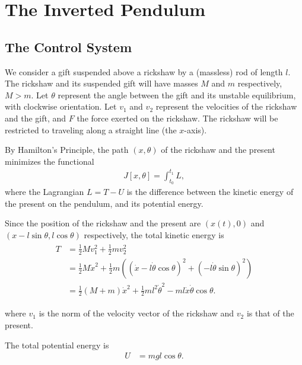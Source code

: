 \section*{The Inverted Pendulum}
\subsection*{The Control System}
We consider a gift suspended above a rickshaw by a (massless) rod of length $l$. 
The rickshaw and its suspended gift will have masses $M$ and $m$ respectively, $M > m$.  
Let $\theta $ represent the angle between the gift and its unstable equilibrium, with clockwise orientation. 
Let $v_1$ and $v_2$ represent the velocities of the rickshaw and the gift, and $F$ the force exerted on the rickshaw. 
The rickshaw will be restricted to traveling along a straight line (the $x$-axis). 

By Hamilton's Principle, the path $(x,\theta)$ of the rickshaw and the present minimizes the functional 
\begin{align}
J[x,\theta] = \int_{t_0}^{t_1}	L,
\end{align}
where the Lagrangian $L = T - U$ is the difference between the kinetic energy of the present on the pendulum, and its potential energy.

Since the position of the rickshaw and the present are $(x(t),0)$ and $(x-l\sin \theta, l\cos \theta)$ respectively, the total kinetic energy is 
\begin{align}
	\begin{split}
	T &= \frac{1}{2}Mv_1^2 +  \frac{1}{2}mv_2^2\\
	&= \frac{1}{2}M\dot{x}^2 +  \frac{1}{2}m\left((\dot{x} - l\dot{\theta}\cos \theta)^2 + (- l\dot{\theta}\sin \theta)^2\right)\\
	&= \frac{1}{2}(M+m)\dot{x}^2 +\frac{1}{2}m l^2\dot{\theta}^2-ml\dot{x}\dot{\theta}\cos \theta.
	\end{split}
\end{align}

\noindent where $v_1$ is the norm of the velocity vector of the rickshaw and $v_2$ is that of the present.

The total potential energy is 
\begin{align*}
U &= mgl\cos \theta.
\end{align*}


